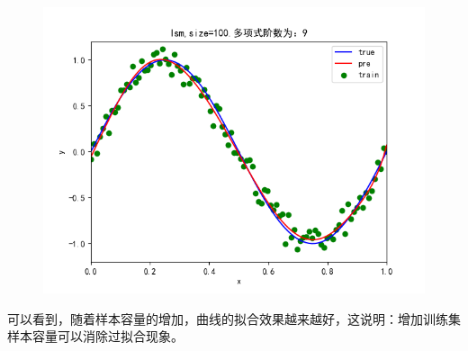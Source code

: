 \documentclass[lang=cn,a4paper,cite=authoryear]{elegantpaper}
\begin{document}
\begin{itemize}
\begin{figure}[H]
	\includegraphics[scale=0.5]{100}
\end{figure}

\end{itemize}
可以看到，随着样本容量的增加，曲线的拟合效果越来越好，这说明：增加训练集样本容量可以消除过拟合现象。
\end{document}
